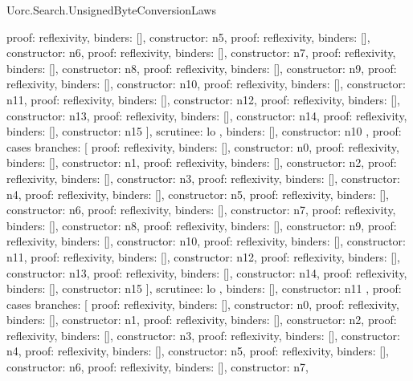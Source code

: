 \begin{lexlean}{Uorc.Search.UnsignedByteConversionLaws}
\begin{semanticmodule}
{{{{            {proof: reflexivity{}, binders: [], constructor: n5},
            {proof: reflexivity{}, binders: [], constructor: n6},
            {proof: reflexivity{}, binders: [], constructor: n7},
            {proof: reflexivity{}, binders: [], constructor: n8},
            {proof: reflexivity{}, binders: [], constructor: n9},
            {proof: reflexivity{}, binders: [], constructor: n10},
            {proof: reflexivity{}, binders: [], constructor: n11},
            {proof: reflexivity{}, binders: [], constructor: n12},
            {proof: reflexivity{}, binders: [], constructor: n13},
            {proof: reflexivity{}, binders: [], constructor: n14},
            {proof: reflexivity{}, binders: [], constructor: n15}
          ],
          scrutinee: lo
        },
        binders: [],
        constructor: n10
      },
      {
        proof: cases{
          branches: [
            {proof: reflexivity{}, binders: [], constructor: n0},
            {proof: reflexivity{}, binders: [], constructor: n1},
            {proof: reflexivity{}, binders: [], constructor: n2},
            {proof: reflexivity{}, binders: [], constructor: n3},
            {proof: reflexivity{}, binders: [], constructor: n4},
            {proof: reflexivity{}, binders: [], constructor: n5},
            {proof: reflexivity{}, binders: [], constructor: n6},
            {proof: reflexivity{}, binders: [], constructor: n7},
            {proof: reflexivity{}, binders: [], constructor: n8},
            {proof: reflexivity{}, binders: [], constructor: n9},
            {proof: reflexivity{}, binders: [], constructor: n10},
            {proof: reflexivity{}, binders: [], constructor: n11},
            {proof: reflexivity{}, binders: [], constructor: n12},
            {proof: reflexivity{}, binders: [], constructor: n13},
            {proof: reflexivity{}, binders: [], constructor: n14},
            {proof: reflexivity{}, binders: [], constructor: n15}
          ],
          scrutinee: lo
        },
        binders: [],
        constructor: n11
      },
      {
        proof: cases{
          branches: [
            {proof: reflexivity{}, binders: [], constructor: n0},
            {proof: reflexivity{}, binders: [], constructor: n1},
            {proof: reflexivity{}, binders: [], constructor: n2},
            {proof: reflexivity{}, binders: [], constructor: n3},
            {proof: reflexivity{}, binders: [], constructor: n4},
            {proof: reflexivity{}, binders: [], constructor: n5},
            {proof: reflexivity{}, binders: [], constructor: n6},
            {proof: reflexivity{}, binders: [], constructor: n7},
}}}}
\end{semanticmodule}
\end{lexlean}

